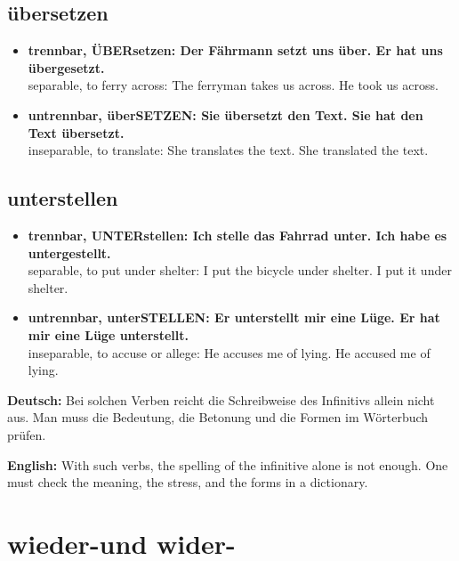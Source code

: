 \documentclass[a4paper,11pt]{article}
\newcommand{\GermanText}[1]{\textbf{Deutsch: }#1\par}
\newcommand{\EnglishText}[1]{{\small\color{SoftGray}\textbf{English: }#1\par}}
\newcommand{\ExampleItem}[2]{\item \textbf{#1}\\{\small\color{SoftGray}#2}}
\begin{document}
        \subsection{\glqq übersetzen\grqq}

        \begin{exbox}
            \begin{itemize}
                \ExampleItem{trennbar, \textbf{ÜBERsetzen}: Der Fährmann setzt uns über. Er hat uns übergesetzt.}{separable, to ferry across: The ferryman takes us across. He took us across.}
                \ExampleItem{untrennbar, über\textbf{SETZEN}: Sie übersetzt den Text. Sie hat den Text übersetzt.}{inseparable, to translate: She translates the text. She translated the text.}
            \end{itemize}
        \end{exbox}

        \subsection{\glqq unterstellen\grqq}

        \begin{exbox}
            \begin{itemize}
                \ExampleItem{trennbar, \textbf{UNTERstellen}: Ich stelle das Fahrrad unter. Ich habe es untergestellt.}{separable, to put under shelter: I put the bicycle under shelter. I put it under shelter.}
                \ExampleItem{untrennbar, unter\textbf{STELLEN}: Er unterstellt mir eine Lüge. Er hat mir eine Lüge unterstellt.}{inseparable, to accuse or allege: He accuses me of lying. He accused me of lying.}
            \end{itemize}
        \end{exbox}

        \begin{warningbox}
            \GermanText{Bei solchen Verben reicht die Schreibweise des Infinitivs allein nicht aus. Man muss die Bedeutung, die Betonung und die Formen im Wörterbuch prüfen.}
            \EnglishText{With such verbs, the spelling of the infinitive alone is not enough. One must check the meaning, the stress, and the forms in a dictionary.}
        \end{warningbox}


    \section{\glqq wieder-\grqq und \glqq wider-\grqq}
\end{document}
